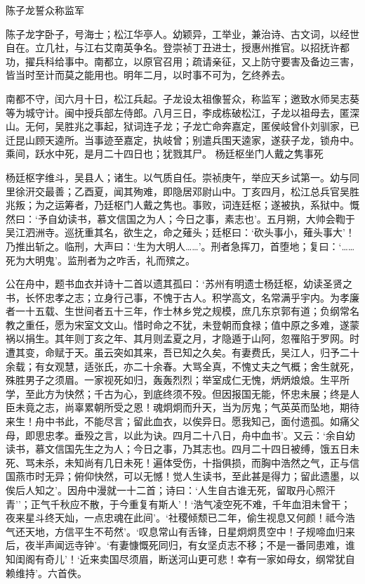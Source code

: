 \documentclass[]{article}
\begin{document}
陈子龙誓众称监军

陈子龙字卧子，号海士；松江华亭人。幼颖异，工举业，兼治诗、古文词，以经世自在。立几社，与江右艾南英争名。登崇祯丁丑进士，授惠州推官。以招抚许都功，擢兵科给事中。南都立，以原官召用；疏请亲征，又上防守要害及备边三害，皆当时至计而莫之能用也。明年二月，以时事不可为，乞终养去。

南都不守，闰六月十日，松江兵起。子龙设太祖像誓众，称监军；邀致水师吴志葵等为城守计。闽中授兵部左侍郎。八月三日，李成栋破松江，子龙以祖母去，匿深山。无何，吴胜兆之事起，狱词连子龙；子龙亡命奔嘉定，匿侯岐曾仆刘驯家，已迁昆山顾天逵所。当事迹至嘉定，执岐曾；别遣兵围天逵家，遂获子龙，锁舟中。乘间，跃水中死，是月二十四日也；犹戮其尸。
杨廷枢坐门人戴之隽事死

杨廷枢字维斗，吴县人；诸生。以气质自任。崇祯庚午，举应天乡试第一。幼与同里徐汧交最善；乙酉夏，闻其殉难，即隐居邓尉山中。丁亥四月，松江总兵官吴胜兆叛；为之运筹者，乃廷枢门人戴之隽也。事败，词连廷枢；遂被执，系狱中。慨然曰：`予自幼读书，慕文信国之为人；今日之事，素志也'。五月朔，大帅会鞫于吴江泗洲寺。巡抚重其名，欲生之，命之薙头；廷枢曰：`砍头事小，薙头事大'！乃推出斩之。临刑，大声曰：`生为大明人\ldots{}\ldots{}'。刑者急挥刀，首堕地；复曰：`\ldots{}\ldots{}死为大明鬼'。监刑者为之咋舌，礼而殡之。

公在舟中，题书血衣并诗十二首以遗其孤曰：`苏州有明遗士杨廷枢，幼读圣贤之书，长怀忠孝之志；立身行己事，不愧于古人。积学高文，名常满乎宇内。为孝廉者一十五载、生世间者五十三年，作士林乡党之规模，庶几东京郭有道；负纲常名教之重任，愿为宋室文文山。惜时命之不犹，未登朝而食禄；值中原之多难，遂蒙祸以捐生。其年则丁亥之年、其月则孟夏之月，才隐遁于山阿，忽罹陷于罗网。时遭其变，命赋于天。虽云突如其来，吾已知之久矣。有妻费氏，吴江人，归予二十余载；有女观慧，适张氏，亦二十余春。大骂全真，不愧丈夫之气概；舍生就死，殊胜男子之须眉。一家视死如归，轰轰烈烈；举室成仁无愧，炳炳烺烺。生平所学，至此方为快然；千古为心，到底终须不殁。但因报国无能，怀忠未展；终是人臣未竟之志，尚辜累朝所受之恩！魂炯炯而升天，当为厉鬼；气英英而坠地，期待来生！舟中书此，不能尽言；留此血衣，以俟异日。愿我知己，面付遗孤。如痛父母，即思忠孝。垂殁之言，以此为诀。四月二十八日，舟中血书'。又云：`余自幼读书，慕文信国先生之为人；今日之事，乃其志也。四月二十四日被缚，饿五日未死、骂未杀，未知尚有几日未死！遍体受伤，十指俱损，而胸中浩然之气，正与信国燕市时无异；俯仰快然，可以无憾！觉人生读书，至此甚是得力；留此遗墨，以俟后人知之'。因舟中漫就一十二首；诗曰：`人生自古谁无死，留取丹心照汗青''；正气千秋应不散，于今重复有斯人'！`浩气凌空死不难，千年血泪未曾干；夜来星斗终天灿，一点忠魂在此间'。`社稷倾颓已二年，偷生视息又何颜！祗今浩气还天地，方信平生不苟然'。`叹息常山有舌锋，日星炯炯贯空中！子规啼血归来后，夜半声闻远寺钟'。`有妻慷慨死同归，有女坚贞志不移；不是一番同患难，谁知闺阁有奇儿'！`近来卖国尽须眉，断送河山更可悲！幸有一家如母女，纲常犹自赖维持'。六首佚。
\end{document}
